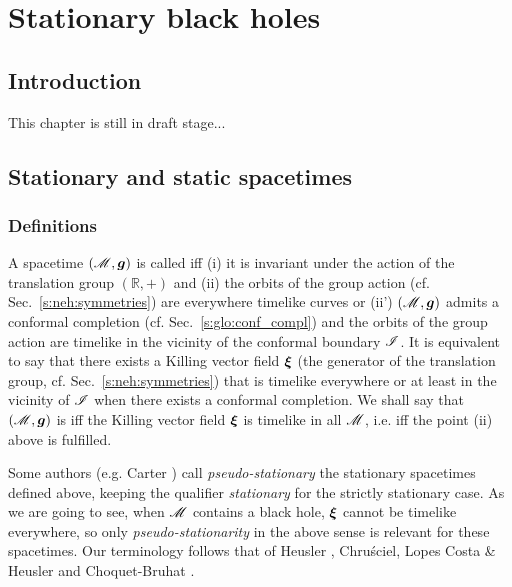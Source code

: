 \chapter{Stationary black holes}
\label{s:sta}

\minitoc

\section{Introduction}

This chapter is still in draft stage...

\section{Stationary and static spacetimes}

\subsection{Definitions} \label{s:sta:def_station}

\begin{greybox}
A spacetime $(\mathscr{M},\bm{g})$ is called 
iff (i) it is invariant under
the action of the translation group $(\mathbb{R},+)$ and (ii) the orbits of
the group action (cf. Sec.~\ref{s:neh:symmetries})
are everywhere timelike curves or (ii') $(\mathscr{M},\bm{g})$
admits a conformal completion (cf. Sec.~\ref{s:glo:conf_compl})
and the orbits of the group action are timelike in the vicinity of
the conformal boundary $\mathscr{I}$.
It is equivalent to say that there exists a Killing vector field
$\bm{\xi}$ (the generator of the translation group, cf. Sec.~\ref{s:neh:symmetries}) that is
timelike everywhere or at least in the vicinity of $\mathscr{I}$ when there exists a conformal
completion. We shall say that $(\mathscr{M},\bm{g})$ is  iff the Killing vector field $\bm{\xi}$ is timelike in all $\mathscr{M}$,
i.e. iff the point (ii) above is fulfilled.
\end{greybox}

\begin{remark} \label{r:sta:pseudo-stationary}
Some authors (e.g. Carter \cite{Carte73b}) call
\emph{pseudo-stationary} the stationary spacetimes
defined above, keeping the qualifier
\emph{stationary} for the strictly stationary case.
As we are going to see, when $\mathscr{M}$
contains a black hole, $\bm{\xi}$ cannot be timelike everywhere,
so only \emph{pseudo-stationarity} in the above sense is relevant for these spacetimes.
Our terminology follows that of
Heusler \cite{Heusl96},
Chru\'sciel, Lopes Costa \& Heusler \cite{ChrusLH12}
and Choquet-Bruhat \cite{Choqu09}.
\end{remark}

